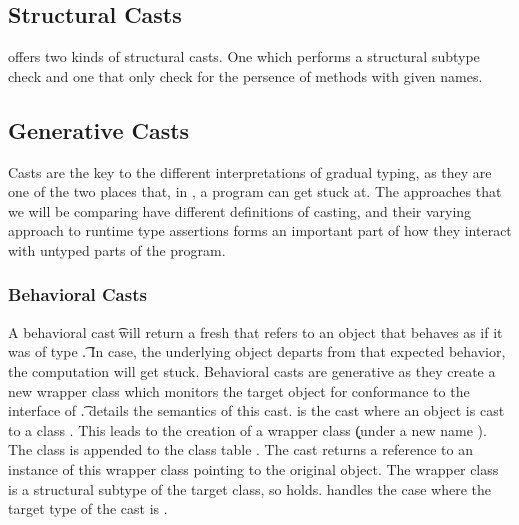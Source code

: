 \documentclass[a4paper,USenglish]{tex/lipics-v2016}
\begin{document}
\subsection{Structural Casts}

\kafka offers two kinds of structural casts. One which performs a structural
subtype check and one that only check for the persence of methods with given
names.



\subsection{Generative Casts}

Casts are the key to the different interpretations of gradual typing, as
they are one of the two places that, in \kafka, a program can get stuck
at. The approaches that we will be comparing have different definitions of
casting, and their varying approach to runtime type assertions forms an
important part of how they interact with untyped parts of the program.

\subsubsection{Behavioral Casts}

A behavioral cast \BehCast\t\a will return a fresh \ap that refers to an
object that behaves as if it was of type \t. In case, the underlying object
departs from that expected behavior, the computation will get
stuck. Behavioral casts are generative as they create a new wrapper class
which monitors the target object for conformance to the interface of \t.
 details the semantics of this cast.  is the
cast where an object \obj\C{\b\a} is cast to a class \Cp. This leads to the
creation of a wrapper class \k (under a new name \D). The class is appended
to the class table \K.  The cast returns a reference \ap to an instance of
this wrapper class pointing to the original object. The wrapper class is a
structural subtype of the target class, so \D\Sub\C holds. 
handles the case where the target type of the cast is \any.
\end{document}
